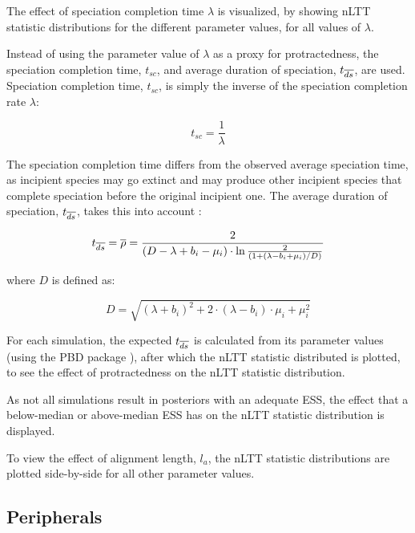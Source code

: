 \documentclass{article}
\begin{document}
The effect of speciation completion time $\lambda$ is visualized, by showing
nLTT statistic distributions for the different parameter values, for all values
of $\lambda$. 

Instead of using the parameter value of $\lambda$ as a proxy for protractedness,
the speciation completion time, $t_{sc}$, and average duration of speciation, $t_{\overline{ds}}$, 
are used. Speciation completion time, $t_{sc}$, is simply the inverse of the
speciation completion rate $\lambda$:

\begin{equation}
  t_{sc} = \frac{1}{\lambda}
  \label{eq:speciation_completion_time}
\end{equation}

The speciation completion time differs from the observed average speciation time, 
as incipient species may go extinct and may produce other incipient species 
that complete speciation before the original incipient one. The average duration 
of speciation, $t_{\overline{ds}}$, takes this into 
account :

\begin{equation}
    t_{\overline{ds}} = \overline{\rho} = \frac{2}{ (D - \lambda + b_i - \mu_i) \cdot \ln{ \frac{2}{(1 + (\lambda - b_i + \mu_i)/D)}  } }
\end{equation}

where $D$ is defined as:

\begin{equation}
    D = \sqrt{ (\lambda + b_i)^2 + 2 \cdot (\lambda - b_i) \cdot \mu_i + \mu_i^2 }
\end{equation}

For each simulation, the expected $t_{\overline{ds}}$ is calculated from its parameter 
values (using the PBD package \cite{PBD}), after which the nLTT statistic 
distributed is plotted, to see the effect of protractedness on the nLTT statistic
distribution.

As not all simulations result in posteriors with an adequate ESS, the
effect that a below-median or above-median ESS has on the nLTT statistic
distribution is displayed. 

To view the effect of alignment length, $l_a$, the nLTT statistic
distributions are plotted side-by-side for all other parameter values. 

\subsection{Peripherals}
\end{document}
